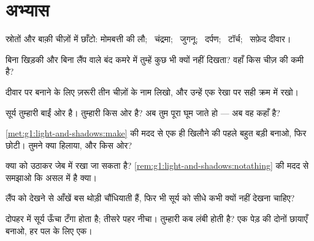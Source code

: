 \section{अभ्यास}

\begin{exercise}[$\star$]\label{exo:g1:light-and-shadows:1}
 स्रोतों और बाक़ी चीज़ों में छाँटो: मोमबत्ती की लौ; \ चंद्रमा;
\ जुगनू; \ दर्पण; \ टॉर्च; \ सफ़ेद दीवार।
\end{exercise}

\begin{exercise}[$\star$]\label{exo:g1:light-and-shadows:2}
बिना खिड़की और बिना लैंप वाले बंद कमरे में तुम्हें कुछ भी क्यों नहीं
दिखता? वहाँ किस चीज़ की कमी है?
\end{exercise}

\begin{exercise}[$\star$]\label{exo:g1:light-and-shadows:3}
दीवार पर  बनाने के लिए ज़रूरी तीन चीज़ों के नाम लिखो, और उन्हें
एक रेखा पर सही क्रम में रखो।
\end{exercise}

\begin{exercise}[$\star$]\label{exo:g1:light-and-shadows:4}
सूर्य तुम्हारी बाईं ओर है। तुम्हारी  किस ओर है? अब तुम पूरा घूम
जाते हो --- अब वह कहाँ है?
\end{exercise}

\begin{exercise}[$\star$]\label{exo:g1:light-and-shadows:5}
\cref{met:g1:light-and-shadows:make} की मदद से एक ही खिलौने की 
पहले बहुत बड़ी बनाओ, फिर छोटी। तुमने क्या हिलाया, और किस ओर?
\end{exercise}

\begin{exercise}[$\star$]\label{exo:g1:light-and-shadows:6}
क्या  को उठाकर जेब में रखा जा सकता है?
\cref{rem:g1:light-and-shadows:notathing} की मदद से समझाओ कि 
असल में है क्या।
\end{exercise}

\begin{exercise}[$\star$]\label{exo:g1:light-and-shadows:7}
लैंप को देखने से आँखें बस थोड़ी चौंधियाती हैं, फिर भी सूर्य को सीधे
कभी क्यों नहीं देखना चाहिए?
\end{exercise}

\begin{exercise}[$\star$]\label{exo:g1:light-and-shadows:8}
दोपहर में सूर्य ऊँचा टँगा होता है; तीसरे पहर नीचा। तुम्हारी  कब
लंबी होती है? एक पेड़ की दोनों छायाएँ बनाओ, हर पल के लिए एक।
\end{exercise}

